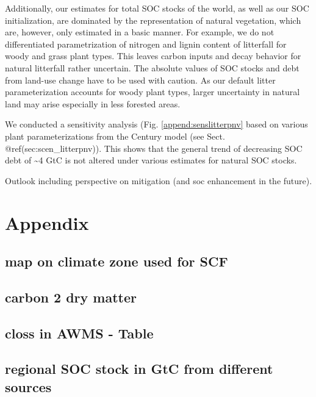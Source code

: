 \documentclass[gc, manuscript]{copernicus}
\begin{document}
Additionally, our estimates for total SOC stocks of the world, as well as our SOC initialization, are dominated by the representation of natural vegetation, which are, however, only estimated in a basic manner. For example, we do not differentiated parametrization of nitrogen and lignin content of litterfall for woody and grass plant types. This leaves carbon inputs and decay behavior for natural litterfall rather uncertain. The absolute values of SOC stocks and debt from land-use change have to be used with caution. As our default litter parameterization accounts for woody plant types, larger uncertainty in natural land may arise especially in less forested areas.

We conducted a sensitivity analysis (Fig. \ref{append:senslitterpnv} based on various plant parameterizations from the Century model (see Sect. @ref(sec:scen\_litterpnv)). This shows that the general trend of decreasing SOC debt of \textasciitilde4 GtC is not altered under various estimates for natural SOC stocks.
\newpage

\conclusions

Outlook including perspective on mitigation (and soc enhancement in the future).
\newpage

\hypertarget{appendix}{%
\section{Appendix}\label{appendix}}

\hypertarget{append:climatemap}{%
\subsection{map on climate zone used for SCF}\label{append:climatemap}}

\hypertarget{append:Tablec2dm}{%
\subsection{carbon 2 dry matter}\label{append:Tablec2dm}}

\hypertarget{append:TableclossAWMS}{%
\subsection{closs in AWMS - Table}\label{append:TableclossAWMS}}

\hypertarget{append:regcompare}{%
\subsection{regional SOC stock in GtC from different sources}\label{append:regcompare}}
\end{document}
